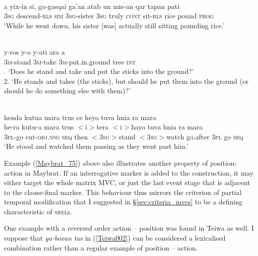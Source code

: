\ea \label{Teiwa_24}
\\
\gll a yix-in si, ga-gasqai ga'an atab un mis-an qar tapan pati \\
3\textsc{sg} descend-\textsc{rls} \textsc{sim} 3\textsc{sg}-sister 3\textsc{sg} truly \textsc{cont} sit-\textsc{rls} rice pound \textsc{prog} \\
\glft `While he went down, his sister [was] actually still sitting pounding rice.'\\ 
\z

\ea \label{Maybrat_75}
\\
\gll y-ros y-o y-ati ara a \\
3\textsc{m}-stand 3\textsc{m}-take 3\textsc{m}-put.in.ground tree \textsc{int} \\
. `Does he stand and take and put the sticks into the ground?' \\ 2. `He stands and takes (the sticks), but should he put them into the ground (or should he do something else with them)?'\\
\z

\ea \label{WBW016}
\\
\glll henda kutua mara trus ce heyo tuva hnia ra mara \\
he-ra kutu-a mara trus $<$i$>$tera $<$i$>$hayo tuva hnia ra mara \\
\textsc{3}\textsc{pl}-go cut-\textsc{obj}.\textsc{nsg} \textsc{seq} then $<$\textsc{3}\textsc{sg}$>$stand $<$\textsc{3}\textsc{sg}$>$watch go.after \textsc{3}\textsc{pl} go \textsc{seq} \\
\glft `He stood and watched them passing as they went past him.'\\ 
\z

Example (\ref{Maybrat_75}) above also illustrates another property of position-action in Maybrat. If an interrogative marker is added to the construction, it may either target the whole matrix MVC, or just the last event stage that is adjacent to the clause-final marker. This behaviour thus mirrors the criterion of partial temporal modification that I suggested in §\ref{sec:criteria_mvcs} to be a defining characteristic of \textsc{srel}s.

One example with a reversed order action -- position was found in Teiwa as well. I suppose that \textit{ga-boxan tas} in (\ref{Teiwa002}) can be considered a lexicalised combination rather than a regular example of position -- action.

